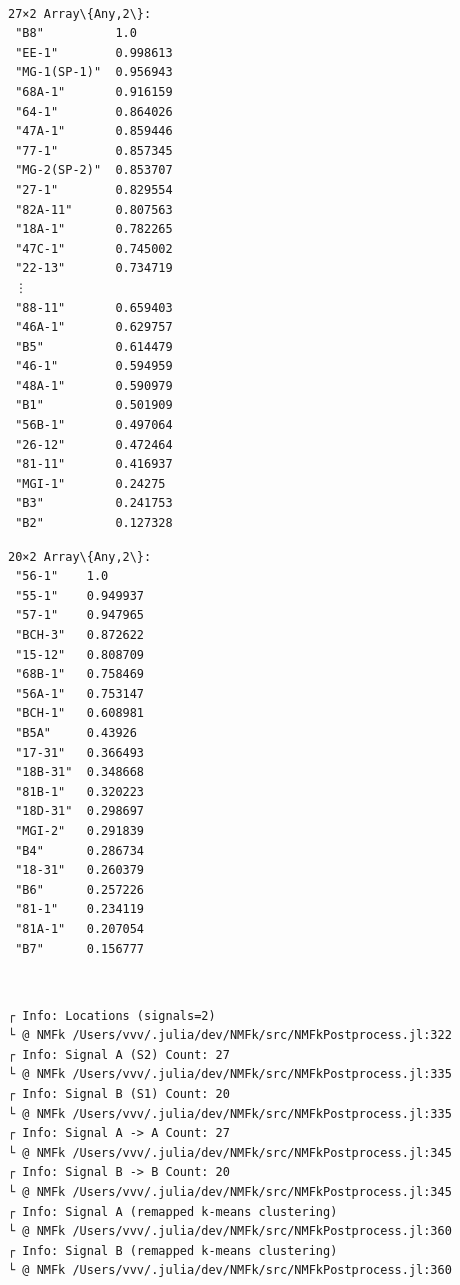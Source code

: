 \documentclass[11pt]{article}
\begin{document}
    \begin{center}
    \end{center}
    { \hspace*{\fill} \\}
    
    
    \begin{Verbatim}[commandchars=\\\{\}]
27×2 Array\{Any,2\}:
 "B8"          1.0
 "EE-1"        0.998613
 "MG-1(SP-1)"  0.956943
 "68A-1"       0.916159
 "64-1"        0.864026
 "47A-1"       0.859446
 "77-1"        0.857345
 "MG-2(SP-2)"  0.853707
 "27-1"        0.829554
 "82A-11"      0.807563
 "18A-1"       0.782265
 "47C-1"       0.745002
 "22-13"       0.734719
 ⋮             
 "88-11"       0.659403
 "46A-1"       0.629757
 "B5"          0.614479
 "46-1"        0.594959
 "48A-1"       0.590979
 "B1"          0.501909
 "56B-1"       0.497064
 "26-12"       0.472464
 "81-11"       0.416937
 "MGI-1"       0.24275
 "B3"          0.241753
 "B2"          0.127328
    \end{Verbatim}

    
    
    \begin{Verbatim}[commandchars=\\\{\}]
20×2 Array\{Any,2\}:
 "56-1"    1.0
 "55-1"    0.949937
 "57-1"    0.947965
 "BCH-3"   0.872622
 "15-12"   0.808709
 "68B-1"   0.758469
 "56A-1"   0.753147
 "BCH-1"   0.608981
 "B5A"     0.43926
 "17-31"   0.366493
 "18B-31"  0.348668
 "81B-1"   0.320223
 "18D-31"  0.298697
 "MGI-2"   0.291839
 "B4"      0.286734
 "18-31"   0.260379
 "B6"      0.257226
 "81-1"    0.234119
 "81A-1"   0.207054
 "B7"      0.156777
    \end{Verbatim}

    
    \begin{center}
    \end{center}
    { \hspace*{\fill} \\}
    
    \begin{Verbatim}[commandchars=\\\{\}]
┌ Info: Locations (signals=2)
└ @ NMFk /Users/vvv/.julia/dev/NMFk/src/NMFkPostprocess.jl:322
┌ Info: Signal A (S2) Count: 27
└ @ NMFk /Users/vvv/.julia/dev/NMFk/src/NMFkPostprocess.jl:335
┌ Info: Signal B (S1) Count: 20
└ @ NMFk /Users/vvv/.julia/dev/NMFk/src/NMFkPostprocess.jl:335
┌ Info: Signal A -> A Count: 27
└ @ NMFk /Users/vvv/.julia/dev/NMFk/src/NMFkPostprocess.jl:345
┌ Info: Signal B -> B Count: 20
└ @ NMFk /Users/vvv/.julia/dev/NMFk/src/NMFkPostprocess.jl:345
┌ Info: Signal A (remapped k-means clustering)
└ @ NMFk /Users/vvv/.julia/dev/NMFk/src/NMFkPostprocess.jl:360
┌ Info: Signal B (remapped k-means clustering)
└ @ NMFk /Users/vvv/.julia/dev/NMFk/src/NMFkPostprocess.jl:360
    \end{Verbatim}
\end{document}
